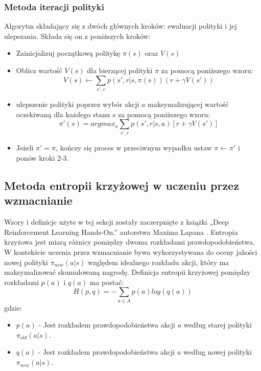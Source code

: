 \documentclass[a4paper, 12pt]{article}
\begin{document}
    \subsubsection{Metoda iteracji polityki}
    Algorytm składający się z dwóch głównych kroków: ewaluacji polityki i jej ulepszania. Składa się on z poniższych kroków:
    \begin{itemize} 
        \item Zainicjalizuj początkową politykę \( \pi(s) \) oraz \( V(s) \)
        \item Oblicz wartość \( V(s) \) dla bierzącej polityki \( \pi \) za pomocą poniższego wzoru:
        \[ V(s) \leftarrow \sum_{s',r} p(s',r|s,\pi(s))(r + \gamma V(s'))\]
        \item ulepszenie polityki poprzez wybór akcji \( a \) maksymalizującej wartość oczekiwaną dla każdego stanu \( s \) za pomocą poniższego wzoru:
        \[ \pi'(s) = argmax_a \sum_{s',r} p(s',r|s,a) [r + \gamma V(s')] \]
        \item Jeżeli \( \pi' = \pi \), kończy się proces w przeciwnym wypadku ustaw \( \pi \leftarrow \pi' \) i ponów kroki 2-3.
    \end{itemize}
    \subsection{Metoda entropii krzyżowej w uczeniu przez wzmacnianie}
    Wzory i definicje użyte w tej sekcji zostały zaczerpnięte z książki „Deep Reinforcement Learning Hands-On.” autorstwa Maxima Lapana \cite{lapan2020deep}.
    Entropia krzyżowa jest miarą różnicy pomiędzy dwoma rozkładami prawdopodobieństwa. W kontekście uczenia przez wzmacnianie bywa wykorzystywana do oceny jakości nowej polityki \( \pi_{new} (a|s) \) względem idealnego rozkładu akcji, który ma maksymalizować skumulowaną nagrodę. Definicja entropii krzyżowej pomiędzy rozkładami \( p(a) \) i \( q(a) \) ma postać:
    \[ H(p,q) = - \sum_{a \in A} p(a) log(q(a)) \]
    gdzie:
    \begin{itemize}
        \item \( p(a) \) - Jest rozkładem prawdopodobieństwa akcji \( a \) według starej polityki \( \pi_{old}(a|s) \).
        \item \( q(a) \) - Jest rozkładem prawdopodobieństwa akcji \( a \) według nowej polityki \( \pi_{new} (a|s) \).
    \end{itemize} 
\end{document}
